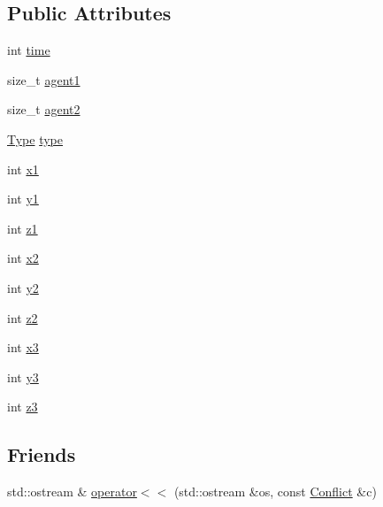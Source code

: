 \subsection*{Public Attributes}
\begin{DoxyCompactItemize}
\item 
int \hyperlink{structlib_multi_robot_planning_1_1_conflict_a086ff6e223b9b10297feba997e96b0aa}{time}
\item 
size\+\_\+t \hyperlink{structlib_multi_robot_planning_1_1_conflict_a59ad0af44ab7de8e34bb54f959b0f7af}{agent1}
\item 
size\+\_\+t \hyperlink{structlib_multi_robot_planning_1_1_conflict_a057f32689f5438209cb8450062ff9fc8}{agent2}
\item 
\hyperlink{structlib_multi_robot_planning_1_1_conflict_a3296f220687e49565bb9b551140d5904}{Type} \hyperlink{structlib_multi_robot_planning_1_1_conflict_ae655db1168c2626d11a663545d41c347}{type}
\item 
int \hyperlink{structlib_multi_robot_planning_1_1_conflict_aa0e8acc26afa57b4888161ef07d7d85a}{x1}
\item 
int \hyperlink{structlib_multi_robot_planning_1_1_conflict_a3ba25bd4fe269ead33b35c1312a02dfb}{y1}
\item 
int \hyperlink{structlib_multi_robot_planning_1_1_conflict_a439430d239251d3d3367a6261907c194}{z1}
\item 
int \hyperlink{structlib_multi_robot_planning_1_1_conflict_ab42ee87616eb071549218cf8af8aa11e}{x2}
\item 
int \hyperlink{structlib_multi_robot_planning_1_1_conflict_a257b0810cb6664aa422c713a49467d7c}{y2}
\item 
int \hyperlink{structlib_multi_robot_planning_1_1_conflict_a435f1f9f9b274d51133d137985761289}{z2}
\item 
int \hyperlink{structlib_multi_robot_planning_1_1_conflict_a85dfd0cb84314e7c3a8ccd4a3f18c565}{x3}
\item 
int \hyperlink{structlib_multi_robot_planning_1_1_conflict_a2791bab0aefef75112040cc03cd965ad}{y3}
\item 
int \hyperlink{structlib_multi_robot_planning_1_1_conflict_a0704de0fe48fcb194b46fc9fd0fcac3b}{z3}
\end{DoxyCompactItemize}
\subsection*{Friends}
\begin{DoxyCompactItemize}
\item 
std\+::ostream \& \hyperlink{structlib_multi_robot_planning_1_1_conflict_a0fda4f63e0d8129b08d7b15bd2d6fb82}{operator$<$$<$} (std\+::ostream \&os, const \hyperlink{structlib_multi_robot_planning_1_1_conflict}{Conflict} \&c)
\end{DoxyCompactItemize}


